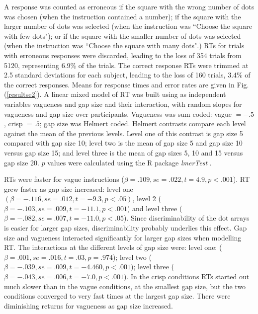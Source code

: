 \documentclass[doc,apacite]{apa6}
\begin{document}
A response was counted as erroneous if the square with the wrong number of dots was chosen (when the instruction contained a number); if the square with the larger number of dots was selected (when the instruction was ``Choose the square with few dots"); or if the square with the smaller number of dots was selected (when the instruction was ``Choose the square with many dots".) %
RTs for trials with erroneous responses were discarded, leading to the loss of 354 trials from 5120, representing 6.9\% of the trials. The correct response RTs were trimmed at 2.5 standard deviations for each subject, leading to the loss of 160 trials, 3.4\% of the correct responses. Means for response times and error rates are given in Fig. (\ref{resultse2}).
A linear mixed model of RT was built using as independent variables vagueness and gap size and their interaction, with random slopes for vagueness and gap size over participants. Vagueness was sum coded: vague $= -.5$, crisp $= .5$; gap size was Helmert coded. Helmert contrasts compare each level against the mean of the previous levels. Level one of this contrast is gap size 5 compared with gap size 10; level two is the mean of gap size 5 and gap size 10 versus gap size 15; and level three is the mean of gap sizes 5, 10 and 15 versus gap size 20. 
$p$ values were calculated using the R package \emph{lmerTest} \cite{lmerTest}.

RTs were faster for vague instructions ($\beta=.109, se=.022, t=4.9, p<.001$). 
%
RT grew faster as gap size increased: level one $(\beta=-.116, se=.012, t=-9.3, p<.05)$, level 2 ($\beta=-.103, se=.009, t=-11.1, p<.001$) and level three ($\beta=-.082, se=.007, t=-11.0, p<.05$). Since discriminability of the dot arrays is easier for larger gap sizes, discriminability probably underlies this effect. Gap size and vagueness interacted significantly for larger gap sizes when modelling RT. %
The interactions at the different levels of gap size were: level one: ($\beta=.001, se=.016, t=.03, p=.974$); level two ($\beta=-.039, se=.009, t=-4.460, p<.001$); level three ($\beta=-.043, se=.006,t=-7.0, p<.001$). In the crisp conditions RTs started out much slower than in the vague conditions, at the smallest gap size, but the two conditions converged to very fast times at the largest gap size. There were diminishing returns for vagueness as gap size increased. 
\end{document}
